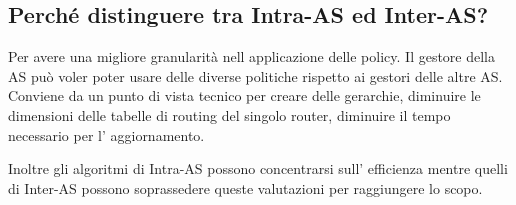 \subsection{Perché distinguere tra Intra-AS ed Inter-AS?}
Per avere una migliore granularità nell applicazione delle policy.
Il gestore della AS può voler poter usare delle diverse politiche rispetto ai gestori delle altre AS.
Conviene da un punto di vista tecnico per creare delle gerarchie, diminuire le dimensioni delle tabelle di routing del singolo router, diminuire il tempo necessario per l' aggiornamento.

Inoltre gli algoritmi di Intra-AS possono concentrarsi sull' efficienza mentre quelli di Inter-AS possono soprassedere queste valutazioni per raggiungere lo scopo.
